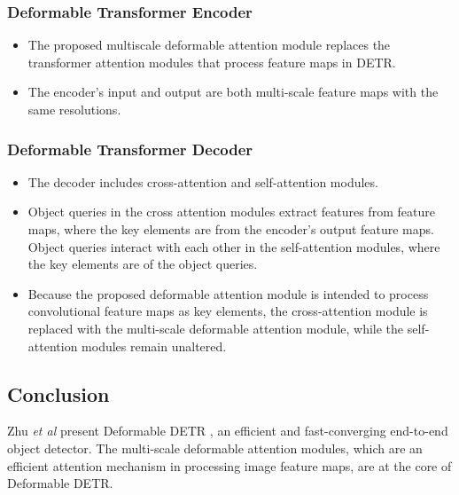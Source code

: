 \subsubsection{Deformable Transformer Encoder}
\begin{itemize}
	\item The proposed multiscale deformable attention module replaces the transformer attention modules that process feature maps in DETR.
	\item The encoder's input and output are both multi-scale feature maps with the same resolutions.
\end{itemize}	


\subsubsection{Deformable Transformer Decoder}

\begin{itemize}
	\item The decoder includes cross-attention and self-attention modules.
	\item Object queries in the cross attention modules extract features from feature maps, where the key elements are from the encoder's output feature maps. Object queries interact with each other in the self-attention modules, where the key elements are of the object queries.
	\item Because the proposed deformable attention module is intended to process convolutional feature maps as key elements, the cross-attention module is replaced with the multi-scale deformable attention module, while the self-attention modules remain unaltered.
\end{itemize}
\subsection{Conclusion}
\par Zhu \textit{et al} present Deformable DETR \cite{zhu2020deformable}, an efficient and fast-converging end-to-end object detector.  The multi-scale deformable attention modules, which are an efficient attention mechanism in processing image feature maps, are at the core of Deformable DETR.